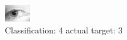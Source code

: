 \begin{figure}[h!]
\begin{center}
\includegraphics[width=0.60\columnwidth]{figures/ID1353_class_4_target_3.png}
\end{center}
\caption{ Classification: 4 actual target: 3}
\label{fig:ID1353_class_4_target_3}
\end{figure}
